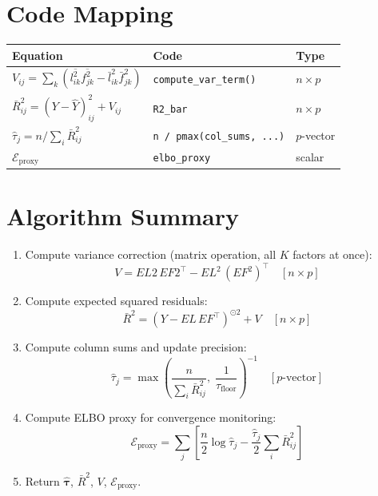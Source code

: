 \documentclass[11pt]{article}
\newcommand{\lbar}[2]{\bar{l}_{#1#2}}
\newcommand{\fbar}[2]{\bar{f}_{#1#2}}
\newcommand{\lsec}[2]{\overline{l^2_{#1#2}}}
\newcommand{\fsec}[2]{\overline{f^2_{#1#2}}}
\begin{document}
\section{Code Mapping}\label{sec:code}

\begin{center}
\begin{tabular}{lll}
\toprule
Equation & Code & Type \\
\midrule
$V_{ij} = \sum_k(\lsec{i}{k}\fsec{j}{k} - \lbar{i}{k}^2\fbar{j}{k}^2)$ & \texttt{compute\_var\_term()} & $n\times p$ \\
$\bar{R}^2_{ij} = (Y-\hat{Y})^2_{ij} + V_{ij}$ & \texttt{R2\_bar} & $n\times p$ \\
$\hat{\tau}_j = n/\sum_i\bar{R}^2_{ij}$ & \texttt{n / pmax(col\_sums, ...)} & $p$-vector \\
$\mathcal{E}_{\text{proxy}}$ & \texttt{elbo\_proxy} & scalar \\
\bottomrule
\end{tabular}
\end{center}

\section{Algorithm Summary}\label{sec:algorithm}

\begin{enumerate}
  \item Compute variance correction (matrix operation, all $K$ factors at once):
    \[V = EL2\,EF2^\top - EL^2\,(EF^2)^\top \quad[n\times p]\]
  \item Compute expected squared residuals:
    \[\bar{R}^2 = (Y - EL\,EF^\top)^{\odot 2} + V \quad[n\times p]\]
  \item Compute column sums and update precision:
    \[\hat{\tau}_j = \max\!\left(\frac{n}{\displaystyle\sum_i\bar{R}^2_{ij}},\;
    \frac{1}{\tau_{\text{floor}}}\right)^{-1} \quad[p\text{-vector}]\]
  \item Compute ELBO proxy for convergence monitoring:
    \[\mathcal{E}_{\text{proxy}} = \sum_j\left[\frac{n}{2}\log\hat{\tau}_j
      - \frac{\hat{\tau}_j}{2}\sum_i\bar{R}^2_{ij}\right]\]
  \item Return $\hat{\bm{\tau}}$, $\bar{R}^2$, $V$, $\mathcal{E}_{\text{proxy}}$.
\end{enumerate}
\end{document}
